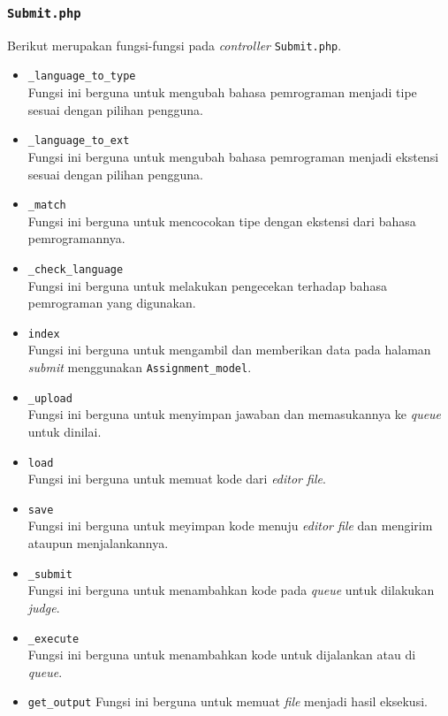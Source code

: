 \subsubsection{\texttt{Submit.php}}
Berikut merupakan fungsi-fungsi pada \textit{controller} \texttt{Submit.php}.
\begin{itemize}
	\item \texttt{\_language\_to\_type}\\
	Fungsi ini berguna untuk mengubah bahasa pemrograman menjadi tipe sesuai dengan pilihan pengguna.
	\item \texttt{\_language\_to\_ext}\\
	Fungsi ini berguna untuk mengubah bahasa pemrograman menjadi ekstensi sesuai dengan pilihan pengguna.
	\item \texttt{\_match}\\
	Fungsi ini berguna untuk mencocokan tipe dengan ekstensi dari bahasa pemrogramannya.
	\item \texttt{\_check\_language}\\
	Fungsi ini berguna untuk melakukan pengecekan terhadap bahasa pemrograman yang digunakan.
	\item \texttt{index}\\
	Fungsi ini berguna untuk mengambil dan memberikan data pada halaman \textit{submit} menggunakan \texttt{Assignment\_model}. 
	\item \texttt{\_upload}\\
	Fungsi ini berguna untuk menyimpan jawaban dan memasukannya ke \textit{queue} untuk dinilai.
	\item \texttt{load}\\
	Fungsi ini berguna untuk memuat kode dari \textit{editor file}.
	\item \texttt{save}\\
	Fungsi ini berguna untuk meyimpan kode menuju \textit{editor file} dan mengirim ataupun menjalankannya.
	\item \texttt{\_submit}\\
	Fungsi ini berguna untuk menambahkan kode pada \textit{queue} untuk dilakukan \textit{judge}.
	\item \texttt{\_execute}\\
	Fungsi ini berguna untuk menambahkan kode untuk dijalankan atau di \textit{queue}.
	\item \texttt{get\_output}
	Fungsi ini berguna untuk memuat \textit{file} menjadi hasil eksekusi.
\end{itemize}
